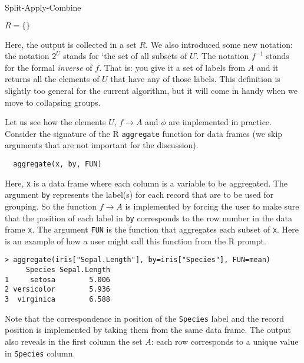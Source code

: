 \documentclass[11pt, fleqn]{article}
\begin{document}
\begin{algorithm}[H]
\caption{Split-Apply-Combine}
\label{alg:sac}

$R = \{\}$\;
\end{algorithm}
Here, the output is collected in a set $R$. We also introduced some new
notation: the notation $2^U$ stands for `the set of all subsets of $U$'. The
notation $f^{-1}$ stands for the formal \emph{inverse} of $f$. That is: you
give it a set of labels from $A$ and it returns all the elements of $U$ that
have any of those labels. This definition is slightly too general for the
current algorithm, but it will come in handy when we move to collapsing groups.

Let us see how the elements $U$, $f\to A$ and $\phi$ are implemented
in practice. Consider the signature of the R \texttt{aggregate} function for data
frames (we skip arguments that are not important for the discussion).
\begin{verbatim}
  aggregate(x, by, FUN)
\end{verbatim}
Here, \texttt{x} is a data frame where each column is a variable to be
aggregated.  The argument \texttt{by} represents the label(s) for each record
that are to be used for grouping. So the function $f\to A$ is implemented by
forcing the user to make sure that the position of each label in \texttt{by}
corresponds to the row number in the data frame \texttt{x}. The argument
\texttt{FUN} is the function that aggregates each subset of \texttt{x}.  Here is
an example of how a user might call this function from the R prompt.
%
\begin{verbatim}
> aggregate(iris["Sepal.Length"], by=iris["Species"], FUN=mean)
     Species Sepal.Length
1     setosa        5.006
2 versicolor        5.936
3  virginica        6.588
\end{verbatim}
%
Note that the correspondence in position of the \texttt{Species} label and the
record position is implemented by taking them from the same data frame. The output
also reveals in the first column the set $A$: each row corresponds to a unique
value in \texttt{Species} column.
\end{document}
